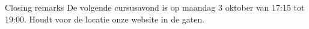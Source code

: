 \begin{frame}{Closing remarks}
De volgende cursusavond is op maandag 3 oktober van 17:15 tot 19:00. Houdt voor de locatie onze website in de gaten.
\begin{center}
\end{center}
\end{frame}